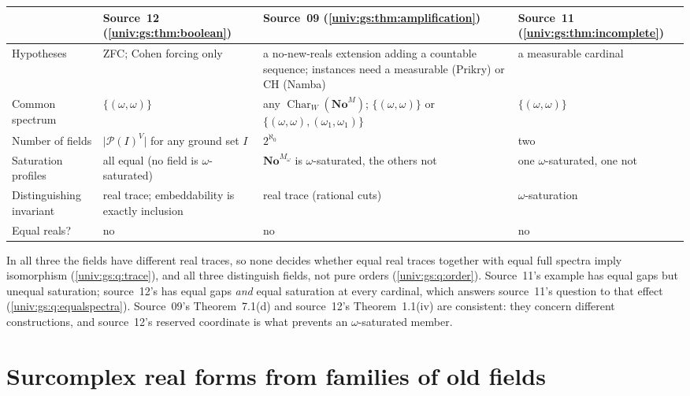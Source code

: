\documentclass[11pt,letterpaper]{article}
\numberwithin{equation}{section}
\theoremstyle{definition}
\theoremstyle{remark}
\newcommand{\No}{\mathbf{No}}
\newcommand{\NoM}{\No^{M}}
\newcommand{\Pow}{\mathcal P}
\newcommand{\abs}[1]{\lvert#1\rvert}
\newcommand{\Char}{\operatorname{Char}}
\begin{document}
{\small
\begin{longtable}{@{}P{0.2\textwidth}P{0.22\textwidth}P{0.22\textwidth}P{0.26\textwidth}@{}}
\toprule
& Source~12 (\cref{univ:gs:thm:boolean}) & Source~09 (\cref{univ:gs:thm:amplification}) & Source~11 (\cref{univ:gs:thm:incomplete})\\
\midrule
\endhead
Hypotheses & ZFC; Cohen forcing only & a no-new-reals extension adding a countable sequence; instances need a measurable (Prikry) or CH (Namba) & a measurable cardinal\\[3pt]
Common spectrum & $\{(\omega,\omega)\}$ & any $\Char_W(\NoM)$; $\{(\omega,\omega)\}$ or $\{(\omega,\omega),(\omega_1,\omega_1)\}$ & $\{(\omega,\omega)\}$\\[3pt]
Number of fields & $\abs{\Pow(I)^V}$ for any ground set $I$ & $2^{\aleph_0}$ & two\\[3pt]
Saturation profiles & all equal (no field is $\omega$-saturated) & $\No^{M_\omega}$ is $\omega$-saturated, the others not & one $\omega$-saturated, one not\\[3pt]
Distinguishing invariant & real trace; embeddability is exactly inclusion & real trace (rational cuts) & $\omega$-saturation\\[3pt]
Equal reals? & no & no & no\\
\bottomrule
\end{longtable}}

\noindent In all three the fields have different real traces, so none decides whether equal real
traces together with equal full spectra imply isomorphism (\cref{univ:gs:q:trace}), and all
three distinguish fields, not pure orders (\cref{univ:gs:q:order}). Source~11's example has
equal gaps but unequal saturation; source~12's has equal gaps \emph{and} equal saturation at every
cardinal, which answers source~11's question to that effect (\cref{univ:gs:q:equalspectra}).
Source~09's Theorem~7.1(d) and source~12's Theorem~1.1(iv) are consistent: they concern different
constructions, and source~12's reserved coordinate is what prevents an $\omega$-saturated member.

\section{Surcomplex real forms from families of old fields}\label{univ:gs:sec:realforms}
\end{document}
